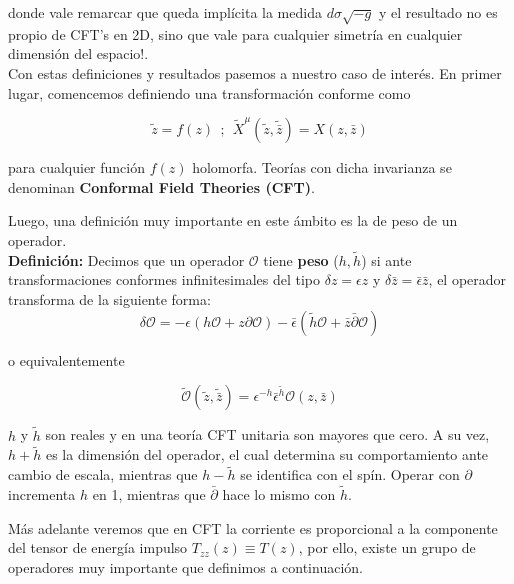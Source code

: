 \documentclass[]{article}
\begin{document}
\noindent donde vale remarcar que queda implícita la medida $ d\sigma \sqrt{-g} $ y el resultado no es propio de CFT's en 2D, sino que vale para cualquier simetría en cualquier dimensión del espacio!.\\

Con estas definiciones y resultados pasemos a nuestro caso de interés. En primer lugar, comencemos definiendo una transformación conforme como

\begin{equation}\label{conf}
\tilde{z}=f(z) \ \ ; \ \ \tilde{X}^{\mu}(\tilde{z},\tilde{\bar{z}})=X(z,\bar{z})
\end{equation}

\noindent para cualquier función $ f(z) $ holomorfa. Teorías con dicha invarianza se denominan \textbf{Conformal Field Theories (CFT)}.

\noindent Luego, una definición muy importante en este ámbito es la de peso de un operador.\\

\noindent \textbf{Definición:} Decimos que un operador $ \mathcal{O} $ tiene \textbf{peso} ($h, \tilde{h} $) si ante transformaciones conformes infinitesimales del tipo $ \delta z=\epsilon z $ y $ \delta \bar{z}=\bar{\epsilon} \bar{z} $, el operador transforma de la siguiente forma:
\begin{equation}\label{pesoinf}
\delta \mathcal{O} = -\epsilon(h\mathcal{O} + z \partial \mathcal{O}) - \bar{\epsilon}(\tilde{h}\mathcal{O} + \bar{z}\bar{\partial}\mathcal{O}) 
\end{equation}

\noindent o equivalentemente 

\begin{equation}\label{pesoinf2}
\tilde{\mathcal{O}}(\tilde{z},\tilde{\bar{z}})=\epsilon^{-h}\bar{\epsilon}^{\tilde{h}}\mathcal{O}(z,\bar{z})
\end{equation}

\noindent $ h $ y $ \tilde{h} $ son reales y en una teoría CFT unitaria son mayores que cero. A su vez, $ h + \tilde{h} $ es la dimensión del operador, el cual determina su comportamiento ante cambio de escala, mientras que $ h - \tilde{h} $  se identifica con el spín. Operar con $ \partial $ incrementa $ h $ en 1, mientras que $ \bar{\partial} $ hace lo mismo con $ \tilde{h} $.

\noindent Más adelante veremos que en CFT la corriente es proporcional a la componente del tensor de energía impulso $ T_{zz}(z) \equiv T(z) $, por ello, existe un grupo de operadores muy importante que definimos a continuación.\\
\end{document}
